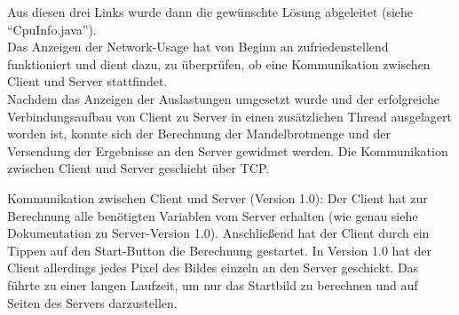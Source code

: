 \documentclass[12pt, onecolumn, notitlepage]{scrartcl}
\begin{document}
Aus diesen drei Links wurde dann die gewünschte Lösung abgeleitet (siehe \enquote{CpuInfo.java}).\\
Das Anzeigen der Network-Usage hat von Beginn an zufriedenstellend funktioniert und dient dazu, zu überprüfen, ob eine Kommunikation zwischen Client und Server stattfindet.\\
Nachdem das Anzeigen der Auslastungen umgesetzt wurde und der erfolgreiche Verbindungsaufbau von Client zu Server in einen zusätzlichen Thread ausgelagert worden ist, konnte sich der Berechnung der Mandelbrotmenge und der Versendung der Ergebnisse an den Server gewidmet werden. Die Kommunikation zwischen Client und Server geschieht über TCP. \par
Kommunikation zwischen Client und Server (Version 1.0): 
Der Client hat zur Berechnung alle benötigten Variablen vom Server erhalten (wie genau siehe Dokumentation zu Server-Version 1.0). Anschließend hat der Client durch ein Tippen auf den Start-Button die Berechnung gestartet. In Version 1.0 hat der Client allerdings jedes Pixel des Bildes einzeln an den Server geschickt. Das führte zu einer langen Laufzeit, um nur das Startbild zu berechnen und auf Seiten des Servers darzustellen.\par
\end{document}
